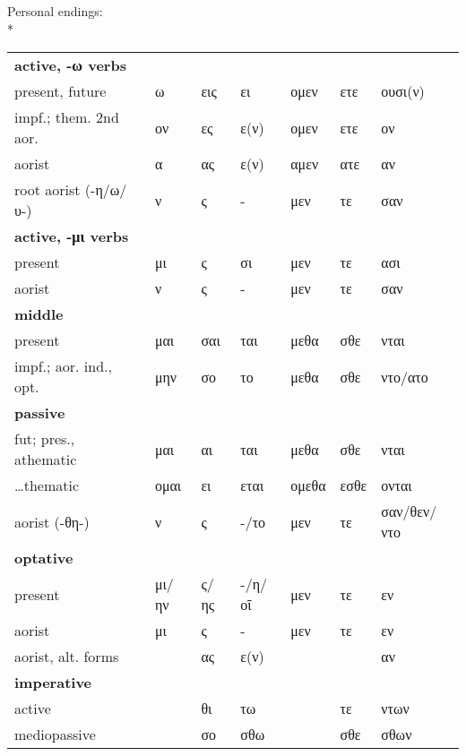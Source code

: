 \begin{small}
Personal endings:\\*
%
\begin{tabular}{lllllll}
\textbf{active, -ω verbs}\\
present, future              & ω      & εις\footnotemark  & ει\footnotemark[3]  & ομεν    & ετε    & ουσι(ν) \\
impf.; them. 2nd aor.        & ον\footnotemark[4] & ες      & ε(ν)      & ομεν    &	ετε    & ον\footnotemark[4] \\
aorist                       & α      & ας      & ε(ν)      & αμεν    & ατε    & αν \\
root aorist (-η/ω/υ-)        & \tca{}ν & \tca{}ς  & \tca{}-  & \tca{}μεν & \tca{}τε & \tca{}σαν \\
\textbf{active, -μι verbs}\\
present                      & μι     & ς       & σι        & μεν     & τε     & ασι \\
aorist                       & \tca{}ν & \tca{}ς  & \tca{}-  & \tca{}μεν & \tca{}τε & \tca{}σαν \\
\textbf{middle}\\
present                      & \tcb{}μαι & σαι  & \tcb{}ται & \tcb{}μεθα & \tcb{}σθε & \tcb{}νται \\
impf.; aor. ind., opt.       & μην    & σο      & το        & μεθα    &	σθε    & ντο/ατο\\
\textbf{passive}\\
fut; pres., athematic        & \tcb{}μαι  & αι  & \tcb{}ται & \tcb{}μεθα & \tcb{}σθε & \tcb{}νται \\
\ldots thematic              & ομαι   & ει\footnotemark[3] & εται      & ομεθα   & εσθε   & ονται \\
aorist (-θη-)                & \tca{}ν & \tca{}ς  & \tca{}-/το  & \tca{}μεν & \tca{}τε & \tca{}σαν/θεν/ντο \\
\textbf{optative}\\
present                      & μι/ην  & ς/ης    & -/η/οῖ    & μεν     & τε     & εν \\
aorist                       & μι     & ς       & -         & μεν     & τε     & εν \\
aorist, alt. forms           &        & ας      & ε(ν)      &         &        & αν \\
\textbf{imperative}\\
active                       &        & θι\footnotemark    & τω        &         & τε     & ντων \\
mediopassive                 &        & σο      & σθω       &         & σθε    & σθων \\
\end{tabular}


\end{small}
